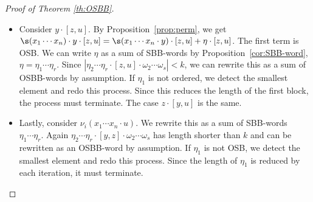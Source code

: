 \documentclass[pdftex]{sigma}
\numberwithin{equation}{section}
\begin{document}
\begin{proof}[Proof of Theorem \ref{th:OSBB}]
\begin{itemize}
 \item Consider $y \cdot [z,u]$. By Proposition~\ref{prop:perm}, we get $\s(x_1 \cdots x_n) \cdot y \cdot [z,u] = \s(x_1 \cdots x_n \cdot y) \cdot [z,u] + \eta \cdot [z,u]$. The first term is OSB. We can write $\eta$ as a sum of SBB-words by Proposition~\ref{cor:SBB-word}, $\eta = \eta_1 \cdots \eta_r$. Since $|\eta_2 \cdots \eta_r \cdot [z,u] \cdot \omega_2 \cdots \omega_s|<k$, we can rewrite this as a sum of OSBB-words by assumption. If $\eta_1$ is not ordered, we detect the smallest element and redo this process. Since this reduces the length of the first block, the process must terminate.
 The case $z \cdot [y,u]$ is the same.
 \item Lastly, consider $\nu_i(x_1 \cdots x_n \cdot u)$. We rewrite this as a sum of SBB-words $\eta_1 \cdots \eta_r$. Again $\eta_2 \cdots \eta_r \cdot [y,z] \cdot \omega_2 \cdots \omega_s$ has length shorter than $k$ and can be rewritten as an OSBB-word by assumption. If $\eta_1$ is not OSB, we detect the smallest element and redo this process. Since the length of $\eta_1$ is reduced by each iteration, it must terminate.
 \end{itemize}


\end{proof}
\end{document}
